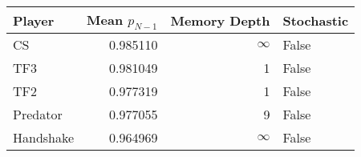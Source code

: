 \begin{tabular}{lrrl}
\toprule
    Player &  Mean $p_{N-1}$ &  Memory Depth & Stochastic \\
\midrule
        CS &        0.985110 &            \(\infty\) &      False \\
       TF3 &        0.981049 &             1 &      False \\
       TF2 &        0.977319 &             1 &      False \\
  Predator &        0.977055 &             9 &      False \\
 Handshake &        0.964969 &            \(\infty\) &      False \\
\bottomrule
\end{tabular}
